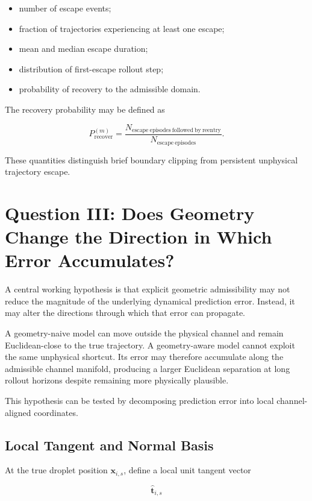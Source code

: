 \documentclass[11pt]{article}
\newcommand{\x}{\mathbf{x}}
\newcommand{\that}{\hat{\mathbf{t}}}
\begin{document}
\begin{itemize}
    \item number of escape events;
    \item fraction of trajectories experiencing at least one escape;
    \item mean and median escape duration;
    \item distribution of first-escape rollout step;
    \item probability of recovery to the admissible domain.
\end{itemize}

The recovery probability may be defined as

\begin{equation}
P_{\mathrm{recover}}^{(m)}
=
\frac{
N_{\mathrm{escape\ episodes\ followed\ by\ reentry}}
}{
N_{\mathrm{escape\ episodes}}
}.
\end{equation}

These quantities distinguish brief boundary clipping from persistent unphysical trajectory escape.

\section{Question III: Does Geometry Change the Direction in Which Error Accumulates?}

A central working hypothesis is that explicit geometric admissibility may not reduce the magnitude of the underlying dynamical prediction error. Instead, it may alter the directions through which that error can propagate.

A geometry-naive model can move outside the physical channel and remain Euclidean-close to the true trajectory. A geometry-aware model cannot exploit the same unphysical shortcut. Its error may therefore accumulate along the admissible channel manifold, producing a larger Euclidean separation at long rollout horizons despite remaining more physically plausible.

This hypothesis can be tested by decomposing prediction error into local channel-aligned coordinates.

\subsection{Local Tangent and Normal Basis}

At the true droplet position \(\x_{i,s}\), define a local unit tangent vector

\begin{equation}
\that_{i,s}
\end{equation}
\end{document}
